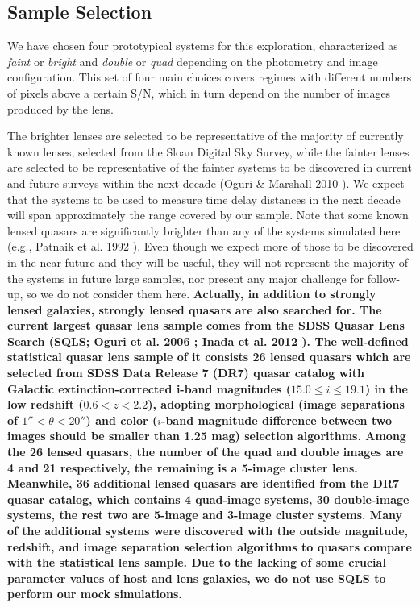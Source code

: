 \documentclass[a4paper,11pt]{article}
\begin{document}
\subsection{Sample Selection}

We have chosen four prototypical systems for this exploration,
characterized as {\it faint} or {\it bright} and {\it double} or {\it
quad} depending on the photometry and image configuration. This set of
four main choices covers regimes with different numbers of pixels
above a certain S/N, which in turn depend on the number of images
produced by the lens.


The brighter lenses are selected to be representative of the majority
of currently known lenses, selected from the Sloan Digital Sky Survey,
while the fainter lenses are selected to be representative of the
fainter systems to be discovered in current and future surveys within
the next decade (Oguri \& Marshall 2010
\cite{2010MNRAS.405.2579O}). We expect that the systems to be used to
measure time delay distances in the next decade will span
approximately the range covered by our sample. Note that some known
lensed quasars are significantly brighter than any of the systems
simulated here (e.g., Patnaik et al. 1992 \cite{1992MNRAS.259P...1P}). Even though we
expect more of those to be discovered in the near future and they will
be useful, they will not represent the majority of the systems in
future large samples, nor present any major challenge for follow-up,
so we do not consider them here. {\bf Actually, in addition to strongly lensed galaxies, 
strongly lensed quasars are also searched for. The current largest quasar lens sample 
comes from the SDSS Quasar Lens Search (SQLS; 
Oguri et al. 2006 \cite{2006AJ....132..999O}; Inada et al. 2012 \cite{2012AJ....143..119I}). 
The well-defined statistical quasar lens sample of it consists 
26 lensed quasars which are selected from SDSS Data Release 7 (DR7) quasar catalog
 with Galactic extinction-corrected i-band magnitudes ($15.0 \leq i \leq19.1$) 
 in the low redshift ($0.6 < z < 2.2$), 
 adopting morphological (image separations of $1'' < \theta < 20''$) 
 and color ($i$-band magnitude difference between two images 
 should be smaller than 1.25 mag) selection algorithms. 
 Among the 26 lensed quasars, the number of the quad and double images 
 are 4 and 21 respectively, the remaining is a 5-image cluster lens. 
 Meanwhile, 36 additional lensed quasars are identified from the DR7 quasar catalog, 
 which contains 4 quad-image systems, 30 double-image systems, 
 the rest two are 5-image and 3-image cluster systems. 
 Many of the additional systems were discovered with the outside magnitude, redshift, 
 and image separation selection algorithms to quasars 
 compare with the statistical lens sample. 
 Due to the lacking of some crucial parameter values of host and lens galaxies, 
 we do not use SQLS to perform our mock simulations.}
\end{document}
